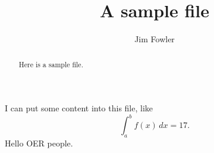 \documentclass{ximera}
\title{A sample file}
\author{Jim Fowler}
\begin{document}
\begin{abstract}
Here is a sample file.
\end{abstract}

\maketitle

I can put some content into this file, like
\[
  \int_a^b f(x) \, dx = 17.
\]
Hello OER people.

\end{document}
